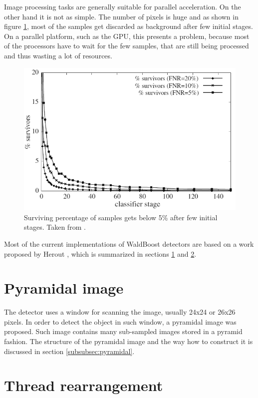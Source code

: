 Image processing tasks are generally suitable for parallel acceleration. On the other hand it is not as simple. The number of pixels is huge and as shown in figure \ref{fig:survivors}, most of the samples get discarded as background after few initial stages. On a parallel platform, such as the GPU, this presents a problem, because most of the processors have to wait for the few samples, that are still being processed and thus wasting a lot of resources.

\begin{center}
\begin{figure}[ht]
	\centering\includegraphics[width=0.50\linewidth]{fig/survivors.png}
	\caption{Surviving percentage of samples gets below 5\% after few initial stages. Taken from \cite{herout2011real}.}
	\label{fig:survivors}
\end{figure}
\end{center}

Most of the current implementations of WaldBoost detectors are based on a work proposed by Herout \cite{herout2011real}, which is summarized in sections \ref{subsec:anal-pyramidal} and \ref{subsec:anal-thread-rearrangement}. 

\section{Pyramidal image}\label{subsec:anal-pyramidal}

The detector uses a window for scanning the image, usually 24x24 or 26x26 pixels. In order to detect the object in such window, a pyramidal image was proposed. Such image contains many sub-sampled images stored in a pyramid fashion. The structure of the pyramidal image and the way how to construct it is discussed in section \ref{subsubsec:pyramidal}.

\section{Thread rearrangement}\label{subsec:anal-thread-rearrangement}


